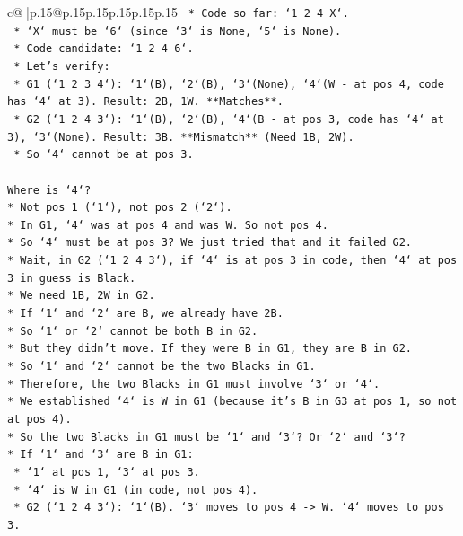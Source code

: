 \documentclass{article}
\begin{document}
{\begin{supertabular}{c@{$\;$}|p{.15\linewidth}@{}p{.15\linewidth}p{.15\linewidth}p{.15\linewidth}p{.15\linewidth}p{.15\linewidth}}
{{{\texttt{    *   Code so far: `1 2 4 X`.} \\
\texttt{    *   `X` must be `6` (since `3` is None, `5` is None).} \\
\texttt{    *   Code candidate: `1 2 4 6`.} \\
\texttt{    *   Let's verify:} \\
\texttt{        *   G1 (`1 2 3 4`): `1`(B), `2`(B), `3`(None), `4`(W {-} at pos 4, code has `4` at 3). Result: 2B, 1W. **Matches**.} \\
\texttt{        *   G2 (`1 2 4 3`): `1`(B), `2`(B), `4`(B {-} at pos 3, code has `4` at 3), `3`(None). Result: 3B. **Mismatch** (Need 1B, 2W).} \\
\texttt{        *   So `4` cannot be at pos 3.} \\
\\ 
\texttt{Where is `4`?} \\
\texttt{*   Not pos 1 (`1`), not pos 2 (`2`).} \\
\texttt{*   In G1, `4` was at pos 4 and was W. So not pos 4.} \\
\texttt{*   So `4` must be at pos 3? We just tried that and it failed G2.} \\
\texttt{*   Wait, in G2 (`1 2 4 3`), if `4` is at pos 3 in code, then `4` at pos 3 in guess is Black.} \\
\texttt{*   We need 1B, 2W in G2.} \\
\texttt{*   If `1` and `2` are B, we already have 2B.} \\
\texttt{*   So `1` or `2` cannot be both B in G2.} \\
\texttt{*   But they didn't move. If they were B in G1, they are B in G2.} \\
\texttt{*   So `1` and `2` cannot be the two Blacks in G1.} \\
\texttt{*   Therefore, the two Blacks in G1 must involve `3` or `4`.} \\
\texttt{*   We established `4` is W in G1 (because it's B in G3 at pos 1, so not at pos 4).} \\
\texttt{*   So the two Blacks in G1 must be `1` and `3`? Or `2` and `3`?} \\
\texttt{*   If `1` and `3` are B in G1:} \\
\texttt{    *   `1` at pos 1, `3` at pos 3.} \\
\texttt{    *   `4` is W in G1 (in code, not pos 4).} \\
\texttt{    *   G2 (`1 2 4 3`): `1`(B). `3` moves to pos 4 {-}> W. `4` moves to pos 3.} \\
}}}
\end{supertabular}}
\end{document}
